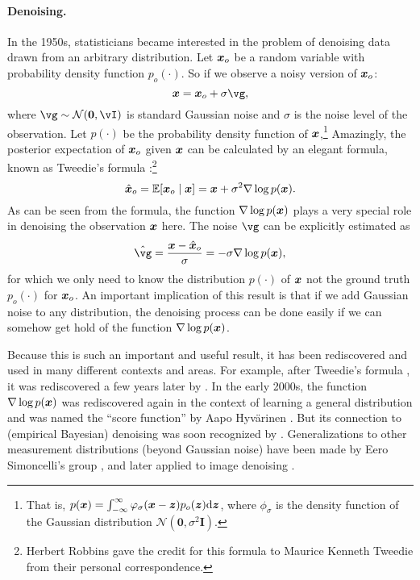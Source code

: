 \documentclass[../../book-main.tex]{subfiles}
\begin{document}
\paragraph{Denoising.} In the 1950s, statisticians became interested in the problem of denoising data drawn from an arbitrary distribution. Let $\bm{x}_o$ be a random variable with probability density function $p_o(\cdot)$. So if we observe a noisy version of $\bm{x}_o$:
\begin{equation}
    \x = \x_o + \sigma \vg, 
\end{equation}
where $\vg \sim \dNorm(\vzero, \vI)$ is standard Gaussian noise and $\sigma$ is the noise level of the observation. Let $p(\cdot)$ be the probability density function of $\bm{x}$,\footnote{That is, $p(\bm{x}) = \int_{-\infty}^{\infty} \varphi_{\sigma}(\bm{x} - \bm{z})p_o(\bm{z}) \mathrm{d}\bm{z}$, where $\phi_{\sigma}$ is the density function of the Gaussian distribution $\mathcal{N}(\boldsymbol{0}, \sigma^2 \boldsymbol{I})$.} Amazingly, the posterior expectation of $\bm{x}_o$ given $\bm{x}$ can be calculated by an elegant formula, known as Tweedie's formula \cite{Robbins1956AnEB}:\footnote{Herbert Robbins gave the credit for this formula to Maurice Kenneth Tweedie from their personal correspondence.}
\begin{equation}
    \hat {\bm{x}}_o = \mathbb{E}[\bm{x}_o\mid \bm{x}] = \bm{x} + \sigma^2 \nabla \log p(\bm{x}).
\end{equation}
As can be seen from the formula, the function $\nabla \log p(\bm{x})$ plays a very special role in denoising the observation $\bm{x}$ here. The noise $\vg$ can be explicitly estimated as
\begin{equation}
    \hat{\vg} = \frac{\x - \hat \x_o}{\sigma} = -\sigma \nabla \log p(\x),
\end{equation}
for which we only need to know the distribution $p(\cdot)$ of $\bm{x}$ not the ground truth $p_o(\cdot)$ for $\bm{x}_o$. An important implication of this result is that if we add Gaussian noise to any distribution, the denoising process can be done easily if we can somehow get hold of the function $\nabla \log p(\bm{x})$.

Because this is such an important and useful result, it has been rediscovered and used in many different contexts and areas. For example, after Tweedie's formula \cite{Robbins1956AnEB}, it was rediscovered a few years later by \cite{Miyasawa61}. In the early 2000s, the function $\nabla \log p(\bm{x})$ was rediscovered again in the context of learning a general distribution and was named the ``score function'' by Aapo Hyv\"{a}rinen \cite{hyvarinen05a}. But its connection to (empirical Bayesian) denoising was soon recognized by \cite{Vincent2011}.
Generalizations to other measurement distributions (beyond Gaussian noise) have been made by Eero Simoncelli's group \cite{Raphan10}, and later applied to image denoising \cite{Kadkhodaie21a,ho2020denoising}.
\end{document}
